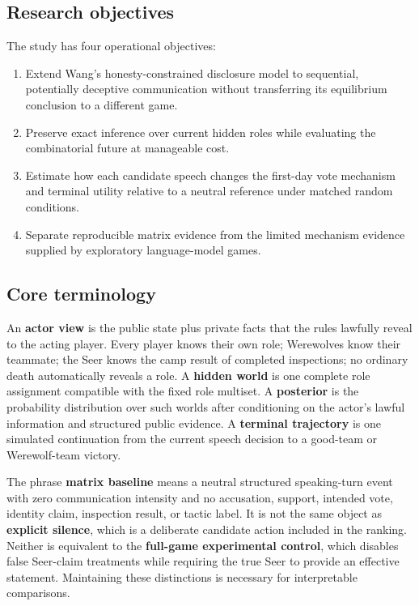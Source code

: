 \documentclass[11pt,a4paper]{article}
\newcommand{\term}[1]{\textbf{#1}}
\begin{document}
\subsection{Research objectives}

The study has four operational objectives:

\begin{enumerate}
  \item Extend Wang's honesty-constrained disclosure model to sequential, potentially deceptive communication without transferring its equilibrium conclusion to a different game.
  \item Preserve exact inference over current hidden roles while evaluating the combinatorial future at manageable cost.
  \item Estimate how each candidate speech changes the first-day vote mechanism and terminal utility relative to a neutral reference under matched random conditions.
  \item Separate reproducible matrix evidence from the limited mechanism evidence supplied by exploratory language-model games.
\end{enumerate}

\subsection{Core terminology}

An \term{actor view} is the public state plus private facts that the rules lawfully reveal to the acting player. Every player knows their own role; Werewolves know their teammate; the Seer knows the camp result of completed inspections; no ordinary death automatically reveals a role. A \term{hidden world} is one complete role assignment compatible with the fixed role multiset. A \term{posterior} is the probability distribution over such worlds after conditioning on the actor's lawful information and structured public evidence. A \term{terminal trajectory} is one simulated continuation from the current speech decision to a good-team or Werewolf-team victory.

The phrase \term{matrix baseline} means a neutral structured speaking-turn event with zero communication intensity and no accusation, support, intended vote, identity claim, inspection result, or tactic label. It is not the same object as \term{explicit silence}, which is a deliberate candidate action included in the ranking. Neither is equivalent to the \term{full-game experimental control}, which disables false Seer-claim treatments while requiring the true Seer to provide an effective statement. Maintaining these distinctions is necessary for interpretable comparisons.
\end{document}
